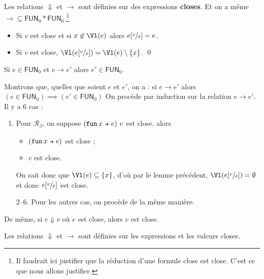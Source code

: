 \documentclass[../main]{subfiles}
\begin{document}
  \begin{rmk}
    Les relations $\Downarrow$ et $\to$ sont définies sur des expressions \textbf{closes}.
    Et on a même ${\to} \subseteq \mathsf{FUN}_0 * \mathsf{FUN}_0$.\footnote{Il faudrait ici justifier que la réduction d'une formule close est close. C'est ce que nous allons justifier.}
  \end{rmk}

  \begin{lem}
    \begin{itemize}
      \item Si $v$ est close et si $x \not\in \Vl(e)$ alors $e[\sfrac{v}{x}] = e$.
      \item Si $v$ est close, $\Vl(e[\sfrac{v}{x}]) = \Vl(e) \setminus \{x\}$.
      \qed
    \end{itemize}
  \end{lem}

  \begin{lem}
    Si $e \in \mathsf{FUN}_0$ et $e \to e'$ alors $e' \in \mathsf{FUN}_0$.
  \end{lem}

  \begin{prv}
    Montrons que, quelles que soient $e$ et $e'$, on a : si $e \to e'$ alors $(e \in \mathsf{FUN}_0) \implies(e' \in \mathsf{FUN}_0)$
    On procède par induction sur la relation $e \to e'$.
    Il y a 6 cas :
    \begin{enumerate}
      \item Pour $\mathcal{R}_\beta$, on suppose $(\fun x e)\ v$ est close, alors
        \begin{itemize}
          \item $(\fun x e)$ est close ;
          \item $v$ est close.
        \end{itemize}
        On sait donc que $\Vl(e) \subseteq \{x\}$, d'où par le lemme précédent, $\Vl(e[\sfrac{v}{x}]) = \emptyset$ et donc $e[\sfrac{v}{x}]$ est close.
      \item[2--6.] Pour les autres cas, on procède de la même manière.
    \end{enumerate}
  \end{prv}

  \begin{rmk}
    De même, si $e \Downarrow v$ où $e$ est close, alors $v$ est close.

    Les relations $\Downarrow$ et $\to$ sont définies sur les expressions et les valeurs closes.
  \end{rmk}
\end{document}
